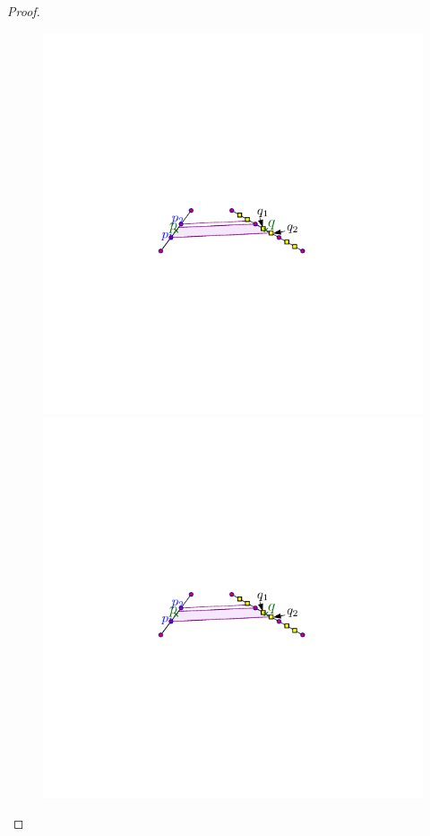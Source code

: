 \documentclass[12pt]{article}%
\begin{document}
\begin{proof}
    \begin{figure}[h]
        \includegraphics[page=2]{figs/points_trap_2}%
        \hfill%
        \includegraphics[page=3]{figs/points_trap_2}

\end{figure}
\end{proof}
\end{document}
